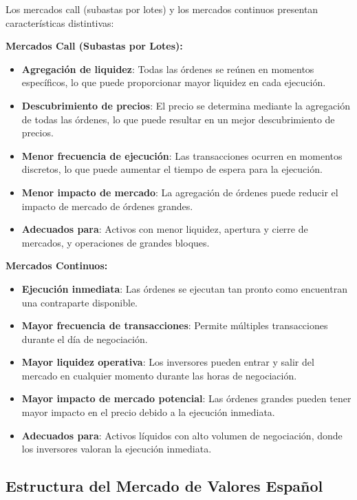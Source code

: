 \begin{proposicion}
Los mercados call (subastas por lotes) y los mercados continuos presentan características distintivas:

\textbf{Mercados Call (Subastas por Lotes):}
\begin{itemize}
\item \textbf{Agregación de liquidez}: Todas las órdenes se reúnen en momentos específicos, lo que puede proporcionar mayor liquidez en cada ejecución.
\item \textbf{Descubrimiento de precios}: El precio se determina mediante la agregación de todas las órdenes, lo que puede resultar en un mejor descubrimiento de precios.
\item \textbf{Menor frecuencia de ejecución}: Las transacciones ocurren en momentos discretos, lo que puede aumentar el tiempo de espera para la ejecución.
\item \textbf{Menor impacto de mercado}: La agregación de órdenes puede reducir el impacto de mercado de órdenes grandes.
\item \textbf{Adecuados para}: Activos con menor liquidez, apertura y cierre de mercados, y operaciones de grandes bloques.
\end{itemize}

\textbf{Mercados Continuos:}
\begin{itemize}
\item \textbf{Ejecución inmediata}: Las órdenes se ejecutan tan pronto como encuentran una contraparte disponible.
\item \textbf{Mayor frecuencia de transacciones}: Permite múltiples transacciones durante el día de negociación.
\item \textbf{Mayor liquidez operativa}: Los inversores pueden entrar y salir del mercado en cualquier momento durante las horas de negociación.
\item \textbf{Mayor impacto de mercado potencial}: Las órdenes grandes pueden tener mayor impacto en el precio debido a la ejecución inmediata.
\item \textbf{Adecuados para}: Activos líquidos con alto volumen de negociación, donde los inversores valoran la ejecución inmediata.
\end{itemize}
\end{proposicion}

\subsection{Estructura del Mercado de Valores Español}


